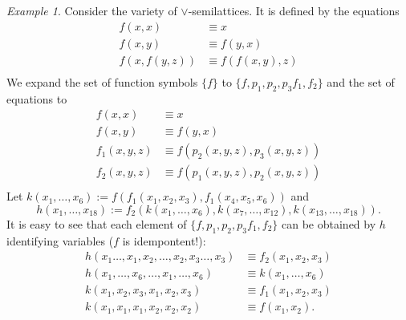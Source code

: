 \documentclass{amsart}
\theoremstyle{plain}
\theoremstyle{definition}
\theoremstyle{remark}
\newtheorem{example}[theorem]{Example}
\begin{document}
\begin{example}
    \label{ex_semilat}
    Consider the variety of $\lor$-semilattices. 
    It is defined by the equations 
    \begin{align*}
        f(x,x) & \equiv x \\
        f(x,y) & \equiv f(y,x) \\
        f(x, f(y,z)) & \equiv f(f(x,y),z) \\
    \end{align*}
    We expand the set of function symbols $\{f\}$ to $\{f,p_1, p_2, p_3 f_1, f_2\}$ and the set of equations to 
    \begin{align*}
        f(x,x) & \equiv x \\
        f(x,y) & \equiv f(y,x) \\
        f_1(x,y,z) & \equiv f(p_2(x,y,z),p_3(x,y,z)) \\
        f_2(x,y,z) & \equiv f(p_1(x,y,z), p_2(x,y,z)) \\
    \end{align*}
    Let $k(x_1, \ldots, x_6):= f(f_1(x_1, x_2, x_3), f_1(x_4,x_5,x_6))$ and 
    \begin{equation*}
        h(x_1, \ldots, x_{18}):=f_2(k(x_1, \ldots, x_6),k(x_7, \ldots, x_{12}),k(x_{13}, \ldots, x_{18})) \text{.}
    \end{equation*}
    It is easy to see that each element of $\{f,p_1, p_2, p_3 f_1, f_2\}$ can be obtained by $h$ identifying variables ($f$ is idempontent!):
    \begin{align*}
        h(x_1 \ldots, x_1, x_2, \ldots, x_2 , x_3 \ldots, x_3) & \equiv f_2(x_1,x_2,x_3) \\
        h(x_1, \ldots, x_6, \ldots, x_1, \ldots, x_6) & \equiv k(x_1, \ldots, x_6) \\
        k(x_1, x_2, x_3, x_1, x_2, x_3) & \equiv f_1(x_1, x_2, x_3) \\
        k(x_1, x_1, x_1, x_2, x_2, x_2) & \equiv f(x_1, x_2) \text{.}
    \end{align*}
\end{example}
\end{document}
